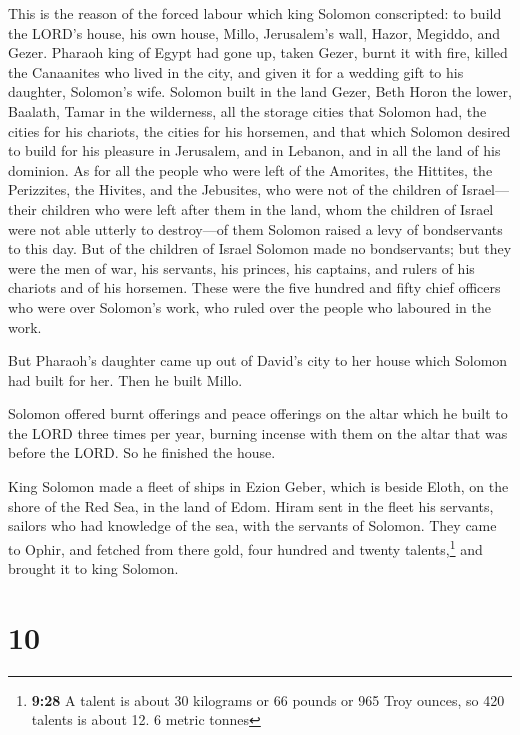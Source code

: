  This is the reason of the forced labour which king
Solomon conscripted: to build the LORD's house, his own house, Millo,
Jerusalem's wall, Hazor, Megiddo, and Gezer.  Pharaoh
king of Egypt had gone up, taken Gezer, burnt it with fire, killed the
Canaanites who lived in the city, and given it for a wedding gift to his
daughter, Solomon's wife.  Solomon built in the land
Gezer, Beth Horon the lower,  Baalath, Tamar in the
wilderness,  all the storage cities that Solomon had, the
cities for his chariots, the cities for his horsemen, and that which
Solomon desired to build for his pleasure in Jerusalem, and in Lebanon,
and in all the land of his dominion.  As for all the
people who were left of the Amorites, the Hittites, the Perizzites, the
Hivites, and the Jebusites, who were not of the children of Israel---
 their children who were left after them in the land,
whom the children of Israel were not able utterly to destroy---of them
Solomon raised a levy of bondservants to this day.  But
of the children of Israel Solomon made no bondservants; but they were
the men of war, his servants, his princes, his captains, and rulers of
his chariots and of his horsemen.  These were the five
hundred and fifty chief officers who were over Solomon's work, who ruled
over the people who laboured in the work.

 But Pharaoh's daughter came up out of David's city to
her house which Solomon had built for her. Then he built Millo.

 Solomon offered burnt offerings and peace offerings on
the altar which he built to the LORD three times per year, burning
incense with them on the altar that was before the LORD. So he finished
the house.

 King Solomon made a fleet of ships in Ezion Geber, which
is beside Eloth, on the shore of the Red Sea, in the land of Edom.
 Hiram sent in the fleet his servants, sailors who had
knowledge of the sea, with the servants of Solomon.  They
came to Ophir, and fetched from there gold, four hundred and twenty
talents,\footnote{\textbf{9:28} A talent is about 30 kilograms or 66
  pounds or 965 Troy ounces, so 420 talents is about 12. 6 metric tonnes}
and brought it to king Solomon.

\hypertarget{section-9}{%
\section{10}\label{section-9}}

